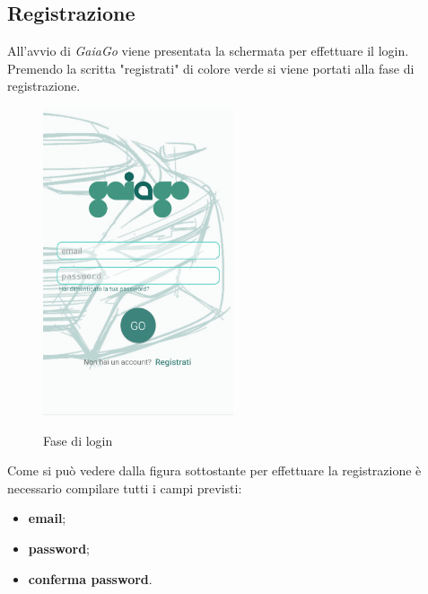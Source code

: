 \subsection{Registrazione}
All'avvio di \textit{GaiaGo} viene presentata la schermata per effettuare il login. Premendo la scritta "registrati" di colore verde si viene portati alla fase di registrazione.
\begin{figure}[H] 
	\centering 
	\includegraphics[width=0.5\textwidth]{res/images/login.png}\\
	\caption{Fase di login}
	\label{Login}
\end{figure}
 \pagebreak
Come si può vedere dalla figura sottostante per effettuare la registrazione è necessario compilare tutti i campi previsti:
\begin{itemize}
	\item \textbf{email};
	\item \textbf{password};
	\item \textbf{conferma password}.
\end{itemize} 

